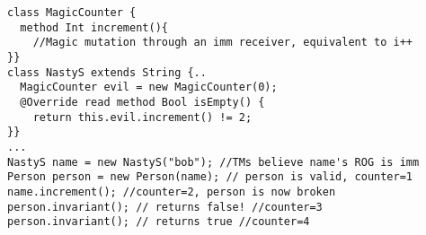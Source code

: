 \begin{lstlisting}
class MagicCounter {
  method Int increment(){
    //Magic mutation through an imm receiver, equivalent to i++
}}
class NastyS extends String {..
  MagicCounter evil = new MagicCounter(0);
  @Override read method Bool isEmpty() {
    return this.evil.increment() != 2; 
}}
...
NastyS name = new NastyS("bob"); //TMs believe name's ROG is imm
Person person = new Person(name); // person is valid, counter=1
name.increment(); //counter=2, person is now broken
person.invariant(); // returns false! //counter=3
person.invariant(); // returns true //counter=4
\end{lstlisting}

%
